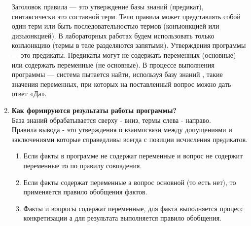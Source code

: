 \begin{enumerate}
  		Заголовок правила — это утверждение базы знаний (предикат), синтаксически это составной терм. Тело правила может представлять собой один терм или быть последовательностью термов (конъюнкцией или дизъюнкцией). В лабораторных работах будем использовать только конъюнкцию (термы в теле разделяются запятыми).
  		Утверждения программы — это предикаты. Предикаты могут не содержать переменных (основные) или содержать переменные (не основные). В процессе выполнения программы — система пытается найти, используя базу знаний , такие значения переменных, при которых на поставленный вопрос можно дать ответ «Да».
  		
    \item \textbf{Как формируются результаты работы программы?}\\
    База знаний обрабатывается сверху - вниз, термы слева - направо.
    \\
    Правила вывода - это утверждения о взаимосвязи между допущениями и заключениями которые справедливы всегда с позиции исчисления предикатов.
    \begin{enumerate}
    	\item Если факты в программе не содержат переменные и вопрос не содержит переменные то по правилу совпадения.
    	\item Если факты содержат переменные а вопрос основной (то есть нет), то применяется правило обобщения фактов.
    	\item Факты и вопросы содержат переменные, для факта выполняется процесс конкретизации а для результата выполняется правило обобщения. 
    \end{enumerate}

\end{enumerate}

